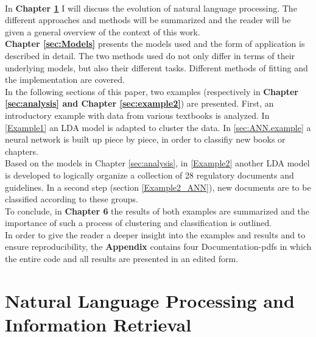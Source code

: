 \documentclass[11pt,a4paper]{article}
\begin{document}
\ \\
In \textbf{Chapter \ref{sec:NLP}} I will discuss the evolution of natural language processing. The different approaches and methods will be summarized and the reader will be given a general overview of the context of this work.\\
\textbf{Chapter \ref{sec:Models}} presents the models used and the form of application is described in detail. The two methods used do not only differ in terms of their underlying models, but also their different tasks. Different methods of fitting and the implementation are covered.\\
In the following sections of this paper, two examples (respectively in \textbf{Chapter \ref{sec:analysis} and Chapter \ref{sec:example2}}) are presented. First, an introductory example with data from various textbooks is analyzed. In \ref{Example1} an LDA model is adapted to cluster the data. In \ref{sec:ANN.example} a neural network is built up piece by piece, in order to classifiy new books or chapters.\\
Based on the models in Chapter \ref{sec:analysis}, in \ref{Example2} another LDA model is developed to logically organize a collection of 28 regulatory documents and guidelines. In a second step (section \ref{Example2_ANN}), new documents are to be classified according to these groups.\\
To conclude, in \textbf{Chapter 6} the results of both examples are summarized and the importance of such a process of clustering and classification is outlined.\\
In order to give the reader a deeper insight into the examples and results and to ensure reproducibility, the \textbf{Appendix} contains four Documentation-pdfs in which the entire code and all results are presented in an edited form.


	
	

\section{Natural Language Processing and Information Retrieval} \label{sec:NLP}
\end{document}
